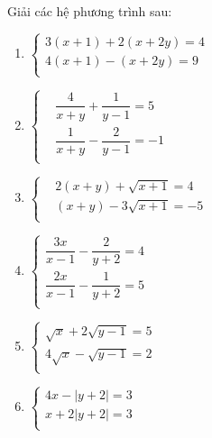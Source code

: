 \begin{bt}
	Giải các hệ phương trình sau:
	\begin{multicols}{2}
		\begin{enumerate}
			\item $\left\{ \begin{aligned}
			3(x+1)+2(x+2y)=4 \\ 
			4(x+1)-(x+2y)=9 \\ 
			\end{aligned} \right.$
			\item $\left\{ \begin{aligned}
			& \dfrac{4}{x+y}+\dfrac{1}{y-1}=5 \\ 
			& \dfrac{1}{x+y}-\dfrac{2}{y-1}=-1 \\ 
			\end{aligned} \right.$   
			\item $\left\{ \begin{aligned}
			& 2\left( x+y \right)+\sqrt{x+1}=4 \\ 
			& \left( x+y \right)-3\sqrt{x+1}=-5 \\ 
			\end{aligned} \right.$  
			\item $\left\{ \begin{aligned}
			\dfrac{3x}{x-1}-\dfrac{2}{y+2}=4 \\ 
			\dfrac{2x}{x-1}-\dfrac{1}{y+2}=5\\ 
			\end{aligned} \right.$  
			\item $\left\{ \begin{aligned}
			\sqrt{x}+2 \sqrt{y-1}=5 \\ 
			4\sqrt{x}- \sqrt{y-1}=2\\ 
			\end{aligned} \right.$  
			\item $\left\{ \begin{aligned}
			4x- \big| y+2\big|=3  \\ 
			x+ 2 \big| y+2\big|=3 \\ 
			\end{aligned} \right.$ 
		\end{enumerate}
	\end{multicols}
\end{bt}

